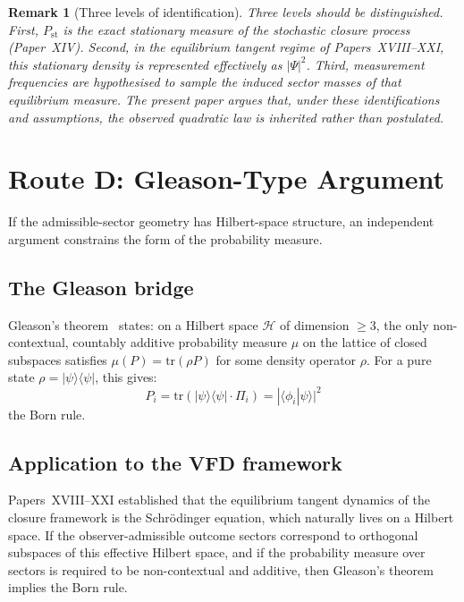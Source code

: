\documentclass[12pt]{article}
\newtheorem{remark}[theorem]{Remark}
\newcommand{\Pst}{P_{\mathrm{st}}}
\begin{document}
\begin{remark}[Three levels of identification]
Three levels should be distinguished. First, $\Pst$ is the exact stationary measure of the stochastic closure process (Paper~XIV). Second, in the equilibrium tangent regime of Papers~XVIII--XXI, this stationary density is represented effectively as $|\Psi|^2$. Third, measurement frequencies are hypothesised to sample the induced sector masses of that equilibrium measure. The present paper argues that, under these identifications and assumptions, the observed quadratic law is inherited rather than postulated.
\end{remark}

\section{Route D: Gleason-Type Argument}\label{sec:gleason}

If the admissible-sector geometry has Hilbert-space structure, an independent argument constrains the form of the probability measure.

\subsection{The Gleason bridge}

Gleason's theorem~\citep{Gleason1957} states: on a Hilbert space $\mathcal{H}$ of dimension $\geq 3$, the only non-contextual, countably additive probability measure $\mu$ on the lattice of closed subspaces satisfies $\mu(P) = \mathrm{tr}(\rho P)$ for some density operator $\rho$. For a pure state $\rho = |\psi\rangle\langle\psi|$, this gives:
\begin{equation}
    P_i = \mathrm{tr}(|\psi\rangle\langle\psi| \cdot \Pi_i) = |\langle \phi_i | \psi \rangle|^2
\end{equation}
the Born rule.

\subsection{Application to the VFD framework}

Papers~XVIII--XXI established that the equilibrium tangent dynamics of the closure framework is the Schr\"odinger equation, which naturally lives on a Hilbert space. If the observer-admissible outcome sectors correspond to orthogonal subspaces of this effective Hilbert space, and if the probability measure over sectors is required to be non-contextual and additive, then Gleason's theorem implies the Born rule.
\end{document}
